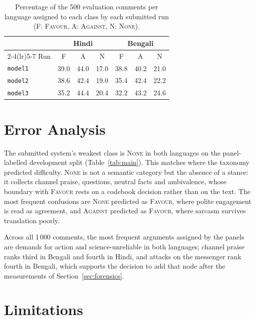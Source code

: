 \documentclass{ceurart}
\begin{document}
\begin{table}[t]
\centering
\caption{Percentage of the 500 evaluation comments per language assigned to
each class by each submitted run (F: \textsc{Favour}, A: \textsc{Against},
N: \textsc{None}).}
\label{tab:testdist}
\begin{tabular}{lcccccc}
\toprule
 & \multicolumn{3}{c}{Hindi} & \multicolumn{3}{c}{Bengali} \\
\cmidrule(lr){2-4}\cmidrule(lr){5-7}
Run & F & A & N & F & A & N \\
\midrule
\texttt{model1} & 39.0 & 44.0 & 17.0 & 38.8 & 40.2 & 21.0 \\
\texttt{model2} & 38.6 & 42.4 & 19.0 & 35.4 & 42.4 & 22.2 \\
\texttt{model3} & 35.2 & 44.4 & 20.4 & 32.2 & 43.2 & 24.6 \\
\bottomrule
\end{tabular}
\end{table}

\newpage
\section{Error Analysis}

The submitted system's weakest class is \textsc{None} in both languages on
the panel-labelled development split (Table~\ref{tab:main}). This matches where the taxonomy predicted
difficulty. \textsc{None} is not a semantic category but the absence of a
stance: it collects channel praise, questions, neutral facts and
ambivalence, whose boundary with \textsc{Favour} rests on a codebook
decision rather than on the text. The most frequent confusions are
\textsc{None} predicted as \textsc{Favour}, where polite engagement is read
as agreement, and \textsc{Against} predicted as \textsc{Favour}, where
sarcasm survives translation poorly.

Across all 1\,000 comments, the most frequent arguments assigned by the
panels are demands for action and science-unreliable in both languages;
channel praise ranks third in Bengali and fourth in Hindi, and attacks on
the messenger rank fourth in Bengali, which supports the decision to add
that node after the measurements of Section~\ref{sec:forensics}.

\section{Limitations}
\label{sec:limitations}
\end{document}
